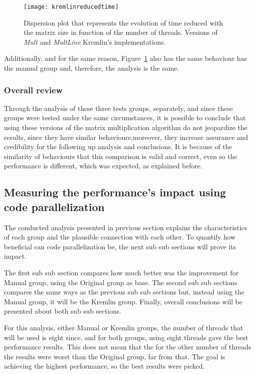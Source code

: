 \begin{figure}[htb]
	\begin{center}
		\leavevmode
		\texttt{[image: kremlinreducedtime]}
		\caption{Dispersion plot that represents the evolution of time reduced with the matrix size in function of the number of threads. Versions of \textit{Mult} and \textit{MultLine} Kremlin's implementations.}
		\label{fig:kremlinreducedtime}
	\end{center}
\end{figure}

Additionally, and for the same reason, Figure~\ref{fig:kremlinreducedtime} also has the same behaviour has the manual group and, therefore, the analysis is the same.

\subsubsection{Overall review}

Through the analysis of these three tests groups, separately, and since these groups were tested under the same circumstances, it is possible to conclude that using these versions of the matrix multiplication algorithm do not jeopardize the results, since they have similar behaviours,moreover, they increase assurance and credibility for the following up analysis and conclusions. It is because of the similarity of behaviours that this comparison is valid and correct, even so the performance is different, which was expected, as explained before.

\subsection{Measuring the performance's impact using code parallelization}

The conducted analysis presented in previous section explains the characteristics of each group and the plausible connection with each other. To quantify how beneficial can code parallelization be, the next sub sub sections will prove its impact. 

The first sub sub section compares how much better was the improvement for Manual group, using the Original group as base. The second sub sub sections compares the same ways as the previous sub sub sections but, instead using the Manual group, it will be the Kremlin group. Finally, overall conclusions will be presented about both sub sub sections. 

For this analysis, either Manual or Kremlin groups, the number of threads that will be used is eight since, and for both groups, using eight threads gave the best performance results. This does not mean that the for the other number of threads the results were worst than the Original group, far from that. The goal is achieving the highest performance, so the best results were picked.

